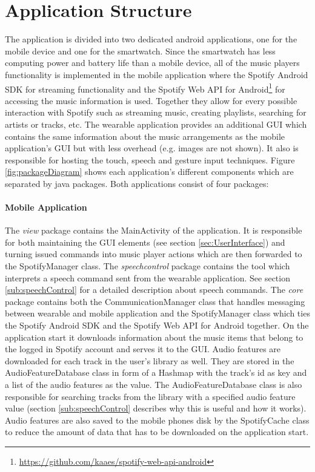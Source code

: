 \section{Application Structure}\label{sec:ApplicationStructure}
The application is divided into two dedicated android applications, one for the mobile device and one for the smartwatch. Since the smartwatch has less computing power and battery life than a mobile device, all of the music players functionality is implemented in the mobile application where the Spotify Android \ac{SDK} for streaming functionality and the Spotify Web \ac{API} for Android\footnote{\url{https://github.com/kaaes/spotify-web-api-android}} for accessing the music information is used. Together they allow for every possible interaction with Spotify such as streaming music, creating playlists, searching for artists or tracks, etc. The wearable application provides an additional \ac{GUI} which contains the same information about the music arrangements as the mobile application's \ac{GUI} but with less overhead (e.g. images are not shown). It also is responsible for hosting the touch, speech and gesture input techniques. Figure \ref{fig:packageDiagram} shows each application's different components which are separated by java packages. Both applications consist of four packages:

\paragraph{Mobile Application}
The \textit{view} package contains the MainActivity of the application. It is responsible for both maintaining the \ac{GUI} elements (see section \ref{sec:UserInterface}) and turning issued commands into music player actions which are then forwarded to the SpotifyManager class. The \textit{speechcontrol} package contains the tool which interprets a speech command sent from the wearable application. See section \ref{sub:speechControl} for a detailed description about speech commands. The \textit{core} package contains both the CommunicationManager class that handles messaging between wearable and mobile application and the SpotifyManager class which ties the Spotify Android \ac{SDK} and the Spotify Web \ac{API} for Android together. On the application start it downloads information about the music items that belong to the logged in Spotify account and serves it to the \ac{GUI}. Audio features are downloaded for each track in the user's library as well. They are stored in the AudioFeatureDatabase class in form of a Hashmap with the track's id as key and a list of the audio features as the value. The AudioFeatureDatabase class is also responsible for searching tracks from the library with a specified audio feature value (section \ref{sub:speechControl} describes why this is useful and how it works). Audio features are also saved to the mobile phones disk by the SpotifyCache class to reduce the amount of data that has to be downloaded on the application start.

